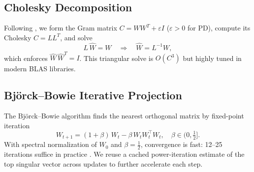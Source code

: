 \subsection{Cholesky Decomposition}

Following \cite{hu_recipe_2023}, we form the Gram matrix \(C = W W^T + \varepsilon I\) (\(\varepsilon>0\) for PD), compute its Cholesky \(C = L L^T\), and solve
\[
  L\,\hat W = W \quad\Longrightarrow\quad \hat W = L^{-1} W,
\]
which enforces \(\hat W\,\hat W^T = I\).  This triangular solve is \(O(C^3)\) but highly tuned in modern BLAS libraries.

\subsection{Björck–Bowie Iterative Projection}

The Björck–Bowie algorithm \cite{bjorck1971iterative} finds the nearest orthogonal matrix by fixed-point iteration
\[
  W_{t+1} = (1+\beta)\,W_t - \beta\,W_t W_t^\top W_t,
  \quad \beta\in\bigl(0,\tfrac12\bigr].
\]
With spectral normalization of \(W_0\) and \(\beta=\tfrac12\), convergence is fast: 12–25 iterations suffice in practice \cite{anil_sorting_2019}.  We reuse a cached power-iteration estimate of the top singular vector across updates to further accelerate each step.




